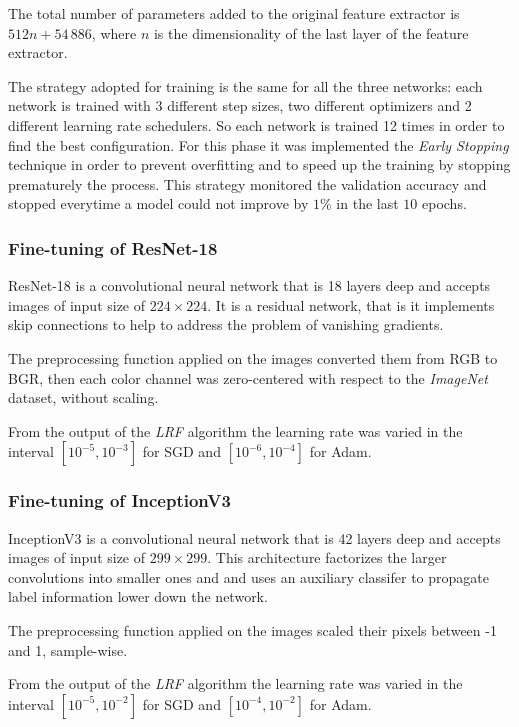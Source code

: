 The total number of parameters added to the original feature extractor is $512n + 54\,886$, where $n$ is the dimensionality of the last layer of the feature extractor.\par
The strategy adopted for training is the same for all the three networks: each network is trained with 3 different step sizes, two different optimizers and 2 different learning rate schedulers. So each network is trained 12 times in order to find the best configuration. For this phase it was implemented the \textit{Early Stopping} technique in order to prevent overfitting and to speed up the training by stopping prematurely the process. This strategy monitored the validation accuracy and stopped everytime a model could not improve by $1\%$ in the last $10$ epochs.



\subsubsection{Fine-tuning of ResNet-18}\label{sec:resnet18}
ResNet-18 is a convolutional neural network that is 18 layers deep and accepts images of input size of $224 \times 224$. It is a residual network, that is it implements skip connections to help to address the problem of vanishing  gradients. \par
The preprocessing function applied on the images converted them from RGB to BGR, then each color channel was zero-centered with respect to the \textit{ImageNet} dataset, without scaling. \par
From the output of the \textit{LRF} algorithm the learning rate was varied in the interval $[10^{-5}, 10^{-3}]$ for SGD and $[10^{-6}, 10^{-4}]$ for Adam.


\subsubsection{Fine-tuning of InceptionV3}\label{sec:inceptionv3}
InceptionV3 is a convolutional neural network that is 42 layers deep and accepts images of input size of $299 \times 299$. This architecture factorizes the larger convolutions  into smaller ones and and uses an auxiliary classifer to propagate label information lower down the network.
 \par
The preprocessing function applied on the images scaled their pixels between -1 and 1, sample-wise. \par
From the output of the \textit{LRF} algorithm the learning rate was varied in the interval $[10^{-5}, 10^{-2}]$ for SGD and $[10^{-4}, 10^{-2}]$ for Adam.



